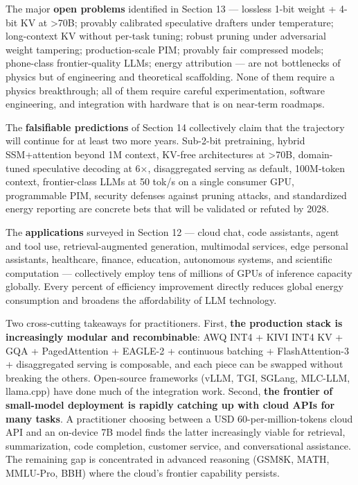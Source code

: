 The major \textbf{open problems} identified in Section 13 --- lossless 1-bit weight + 4-bit KV at \textgreater70B; provably calibrated speculative drafters under temperature; long-context KV without per-task tuning; robust pruning under adversarial weight tampering; production-scale PIM; provably fair compressed models; phone-class frontier-quality LLMs; energy attribution --- are not bottlenecks of physics but of engineering and theoretical scaffolding. None of them require a physics breakthrough; all of them require careful experimentation, software engineering, and integration with hardware that is on near-term roadmaps.

The \textbf{falsifiable predictions} of Section 14 collectively claim that the trajectory will continue for at least two more years. Sub-2-bit pretraining, hybrid SSM+attention beyond 1M context, KV-free architectures at \textgreater70B, domain-tuned speculative decoding at 6×, disaggregated serving as default, 100M-token context, frontier-class LLMs at 50 tok/s on a single consumer GPU, programmable PIM, security defenses against pruning attacks, and standardized energy reporting are concrete bets that will be validated or refuted by 2028.

The \textbf{applications} surveyed in Section 12 --- cloud chat, code assistants, agent and tool use, retrieval-augmented generation, multimodal services, edge personal assistants, healthcare, finance, education, autonomous systems, and scientific computation --- collectively employ tens of millions of GPUs of inference capacity globally. Every percent of efficiency improvement directly reduces global energy consumption and broadens the affordability of LLM technology.

Two cross-cutting takeaways for practitioners. First, \textbf{the production stack is increasingly modular and recombinable}: AWQ INT4 + KIVI INT4 KV + GQA + PagedAttention + EAGLE-2 + continuous batching + FlashAttention-3 + disaggregated serving is composable, and each piece can be swapped without breaking the others. Open-source frameworks (vLLM, TGI, SGLang, MLC-LLM, llama.cpp) have done much of the integration work. Second, \textbf{the frontier of small-model deployment is rapidly catching up with cloud APIs for many tasks}. A practitioner choosing between a USD 60-per-million-tokens cloud API and an on-device 7B model finds the latter increasingly viable for retrieval, summarization, code completion, customer service, and conversational assistance. The remaining gap is concentrated in advanced reasoning (GSM8K, MATH, MMLU-Pro, BBH) where the cloud's frontier capability persists.

